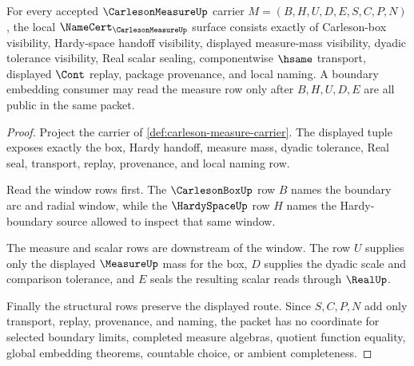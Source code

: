 \begin{theorem}
\label{thm:carleson-measure-namecert-obligations}
For every accepted $\CarlesonMeasureUp$ carrier $M=(B,H,U,D,E,S,C,P,N)$, the local $\NameCert_{\CarlesonMeasureUp}$ surface consists exactly of Carleson-box visibility, Hardy-space handoff visibility, displayed measure-mass visibility, dyadic tolerance visibility, Real scalar sealing, componentwise $\hsame$ transport, displayed $\Cont$ replay, package provenance, and local naming. A boundary embedding consumer may read the measure row only after $B,H,U,D,E$ are all public in the same packet.
\end{theorem}
\begin{proof}
Project the carrier of \autoref{def:carleson-measure-carrier}. The displayed tuple exposes exactly the box, Hardy handoff, measure mass, dyadic tolerance, Real seal, transport, replay, provenance, and local naming row.

Read the window rows first. The $\CarlesonBoxUp$ row $B$ names the boundary arc and radial window, while the $\HardySpaceUp$ row $H$ names the Hardy-boundary source allowed to inspect that same window.

The measure and scalar rows are downstream of the window. The row $U$ supplies only the displayed $\MeasureUp$ mass for the box, $D$ supplies the dyadic scale and comparison tolerance, and $E$ seals the resulting scalar reads through $\RealUp$.

Finally the structural rows preserve the displayed route. Since $S,C,P,N$ add only transport, replay, provenance, and naming, the packet has no coordinate for selected boundary limits, completed measure algebras, quotient function equality, global embedding theorems, countable choice, or ambient completeness.
\end{proof}

